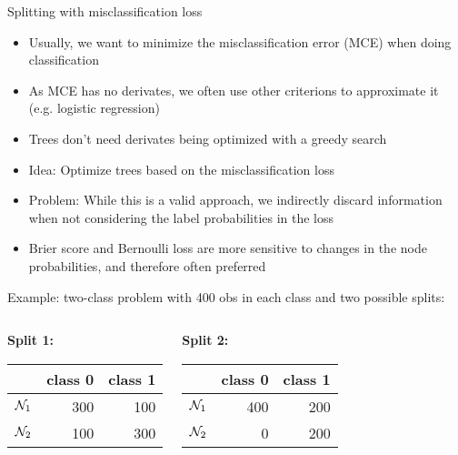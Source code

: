 \documentclass[11pt,compress,t,notes=noshow, xcolor=table]{beamer}
\begin{document}
\begin{vbframe}{Splitting with misclassification loss}

\begin{itemize}
\item Usually, we want to minimize the misclassification error (MCE) when doing classification
\item As MCE has no derivates, we often use other criterions to approximate it (e.g. logistic regression)
\item Trees don't need derivates being optimized with a greedy search
\item Idea: Optimize trees based on the misclassification loss
\item Problem: While this is a valid approach, we indirectly discard information when not considering the label probabilities in the loss
\item Brier score and Bernoulli loss are more sensitive to changes in the node probabilities, and therefore often preferred


\end{itemize}

\framebreak

Example: two-class problem with 400 obs in each class and two possible splits:
\begin{small}
\begin{columns}[T,onlytextwidth]
\begin{center}
\textbf{Split 1:} \\
\vspace{0.25cm}
\begin{table}[ht]
\centering
\begin{tabular}{rrr}
  \hline
 & class 0 & class 1 \\ 
  \hline
$\mathcal{N}_1$ & 300 & 100 \\ 
  $\mathcal{N}_2$ & 100 & 300 \\ 
   \hline
\end{tabular}
\end{table}

\end{center}
\begin{center}
\textbf{Split 2:} \\
\vspace{0.25cm}
\begin{table}[ht]
\centering
\begin{tabular}{rrr}
  \hline
 & class 0 & class 1 \\ 
  \hline
$\mathcal{N}_1$ & 400 & 200 \\ 
  $\mathcal{N}_2$ &   0 & 200 \\ 
   \hline
\end{tabular}
\end{table}


\end{center}
\end{columns}
\end{small}
\end{vbframe}
\end{document}
